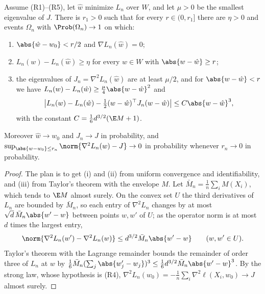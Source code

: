 \begin{refsection}
\begin{lemma}\label{lem:regular:local}
Assume (R1)--(R5), let $\hat w$ minimize $L_n$ over $W$, and let $\mu>0$ be the smallest eigenvalue of $J$. There is $r_1>0$ such that for every $r\in(0,r_1]$ there are $\eta>0$ and events $\Omega_n$ with $\Prob(\Omega_n)\to1$ on which:
\begin{enumerate}
\item $\abs{\hat w-w_0}<r/2$ and $\nabla L_n(\hat w)=0$;
\item $L_n(w)-L_n(\hat w)\ge\eta$ for every $w\in W$ with $\abs{w-\hat w}\ge r$;
\item the eigenvalues of $J_n=\nabla^2L_n(\hat w)$ are at least $\mu/2$, and for $\abs{w-\hat w}<r$ we have $L_n(w)-L_n(\hat w)\ge\frac\mu4\abs{w-\hat w}^2$ and
\[
\bigl|L_n(w)-L_n(\hat w)-\tfrac12(w-\hat w)^\top J_n(w-\hat w)\bigr|\le C\abs{w-\hat w}^3,
\]
with the constant $C=\frac16d^{3/2}(\E M+1)$.
\end{enumerate}
Moreover $\hat w\to w_0$ and $J_n\to J$ in probability, and $\sup_{\abs{w-w_0}\le r_n}\norm{\nabla^2L_n(w)-J}\to0$ in probability whenever $r_n\to0$ in probability.
\end{lemma}

\begin{proof}
The plan is to get (i) and (ii) from uniform convergence and identifiability, and (iii) from Taylor's theorem with the envelope $M$. Let $\bar M_n=\frac1n\sum_iM(X_i)$, which tends to $\E M$ almost surely. On the convex set $U$ the third derivatives of $L_n$ are bounded by $\bar M_n$, so each entry of $\nabla^2L_n$ changes by at most $\sqrt d\,\bar M_n\abs{w'-w}$ between points $w,w'$ of $U$; as the operator norm is at most $d$ times the largest entry,
\begin{equation}\label{eq:regular:lip}
\norm{\nabla^2L_n(w')-\nabla^2L_n(w)}\le d^{3/2}\bar M_n\abs{w'-w}\qquad(w,w'\in U).
\end{equation}
Taylor's theorem with the Lagrange remainder bounds the remainder of order three of $L_n$ at $w$ by $\frac16\bar M_n(\sum_j\abs{w'_j-w_j})^3\le\frac16d^{3/2}\bar M_n\abs{w'-w}^3$. By the strong law, whose hypothesis is (R4), $\nabla^2L_n(w_0)=-\frac1n\sum_i\nabla^2\ell(X_i,w_0)\to J$ almost surely.


\end{proof}
\end{refsection}
